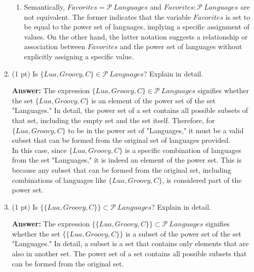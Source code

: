 \documentclass[12pt]{article}
\begin{document}
\begin{spacing}{1.5}
\begin{enumerate}
\begin{enumerate}
		      	\item Semantically, $Favorites = \mathcal{P} \: Languages$ and $Favorites : \mathcal{P} \: Languages$ are not equivalent. The former indicates that the variable $Favorites$ is set to be equal to the power set of languages, implying a specific assignment of values. On the other hand, the latter notation suggests a relationship or association between $Favorites$ and the power set of languages without explicitly assigning a specific value.\\
		      \end{enumerate}
		      		      		      		                  
		\item (1 pt) Is $\{Lua, Groovy, C\} \in \mathcal{P} \: Languages$? Explain in detail.
		      		      		      		      
		      \textbf{Answer:} The expression $\{Lua, Groovy, C\} \in \mathcal{P} \: Languages$ signifies whether the set $\{Lua, Groovy, C\}$ is an element of the power set of the set "Languages." In detail, the power set of a set contains all possible subsets of that set, including the empty set and the set itself. Therefore, for $\{Lua, Groovy, C\}$ to be in the power set of "Languages," it must be a valid subset that can be formed from the original set of languages provided.\\
		      		      		      		                  
		      In this case, since $\{Lua, Groovy, C\}$ is a specific combination of languages from the set "Languages," it is indeed an element of the power set. This is because any subset that can be formed from the original set, including combinations of languages like $\{Lua, Groovy, C\}$, is considered part of the power set.\\
		      		      		      		                  
		\item (1 pt) Is $\{\{Lua, Groovy, C\}\} \subset \mathcal{P} \: Languages$? Explain in detail.
		      		      		      		      
		      \textbf{Answer:}  The expression $\{\{Lua, Groovy, C\}\} \subset \mathcal{P} \: Languages$ signifies whether the set $\{\{Lua, Groovy, C\}\}$ is a subset of the power set of the set "Languages." In detail, a subset is a set that contains only elements that are also in another set. The power set of a set contains all possible subsets that can be formed from the original set.\\
		      		      		      		                  

\end{enumerate}
\end{spacing}
\end{document}
